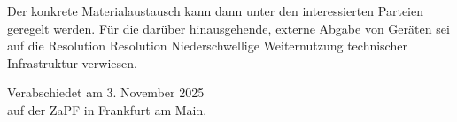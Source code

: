 \documentclass[DIV=calc]{scrartcl}
\let\oldgrqq=\grqq
\def\grqq{\oldgrqq\xspace}
\begin{document}
Der konkrete Materialaustausch kann dann unter den interessierten Parteien geregelt werden. Für die darüber hinausgehende, externe Abgabe von Geräten sei auf die Resolution \glqq Resolution Niederschwellige Weiternutzung technischer Infrastruktur\grqq{} verwiesen.


%
\vfill
\begin{flushright}
	Verabschiedet am 3. November 2025 \\
	auf der ZaPF in Frankfurt am Main.
\end{flushright}
\end{document}
